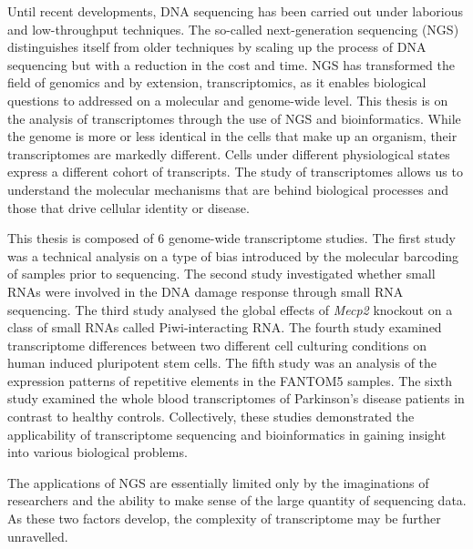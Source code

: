 Until recent developments, DNA sequencing has been carried out under laborious and low-throughput techniques. The so-called next-generation sequencing (NGS) distinguishes itself from older techniques by scaling up the process of DNA sequencing but with a reduction in the cost and time. NGS has transformed the field of genomics and by extension, transcriptomics, as it enables biological questions to addressed on a molecular and genome-wide level. This thesis is on the analysis of transcriptomes through the use of NGS and bioinformatics. While the genome is more or less identical in the cells that make up an organism, their transcriptomes are markedly different. Cells under different physiological states express a different cohort of transcripts. The study of transcriptomes allows us to understand the molecular mechanisms that are behind biological processes and those that drive cellular identity or disease.

This thesis is composed of 6 genome-wide transcriptome studies. The first study was a technical analysis on a type of bias introduced by the molecular barcoding of samples prior to sequencing. The second study investigated whether small RNAs were involved in the DNA damage response through small RNA sequencing. The third study analysed the global effects of \textit{Mecp2} knockout on a class of small RNAs called Piwi-interacting RNA. The fourth study examined transcriptome differences between two different cell culturing conditions on human induced pluripotent stem cells. The fifth study was an analysis of the expression patterns of repetitive elements in the FANTOM5 samples. The sixth study examined the whole blood transcriptomes of Parkinson's disease patients in contrast to healthy controls. Collectively, these studies demonstrated the applicability of transcriptome sequencing and bioinformatics in gaining insight into various biological problems.

The applications of NGS are essentially limited only by the imaginations of researchers and the ability to make sense of the large quantity of sequencing data. As these two factors develop, the complexity of transcriptome may be further unravelled.
